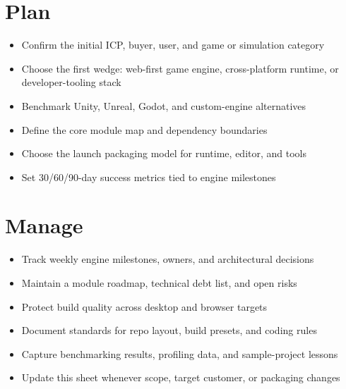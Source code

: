 \documentclass[10pt]{article}
\newcommand{\checkitem}[1]{\item[$\square$] #1}
\begin{document}
\begin{minipage}[t]{0.49\textwidth}
\section*{Plan}
\begin{itemize}
    \checkitem{Confirm the initial ICP, buyer, user, and game or simulation category}
    \checkitem{Choose the first wedge: web-first game engine, cross-platform runtime, or developer-tooling stack}
    \checkitem{Benchmark Unity, Unreal, Godot, and custom-engine alternatives}
    \checkitem{Define the core module map and dependency boundaries}
    \checkitem{Choose the launch packaging model for runtime, editor, and tools}
    \checkitem{Set 30/60/90-day success metrics tied to engine milestones}
\end{itemize}

\section*{Manage}
\begin{itemize}
    \checkitem{Track weekly engine milestones, owners, and architectural decisions}
    \checkitem{Maintain a module roadmap, technical debt list, and open risks}
    \checkitem{Protect build quality across desktop and browser targets}
    \checkitem{Document standards for repo layout, build presets, and coding rules}
    \checkitem{Capture benchmarking results, profiling data, and sample-project lessons}
    \checkitem{Update this sheet whenever scope, target customer, or packaging changes}
\end{itemize}
\end{minipage}\hfill
\end{document}
